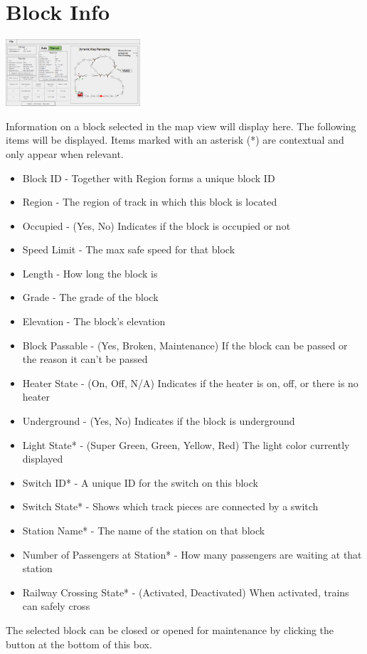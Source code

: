 \documentclass{scrreprt}
\begin{document}
\section{Block Info}
\begin{center}
  \includegraphics[trim={8.75cm 6.7cm 19.2cm 3.2cm},clip,width=5cm]{CTC-main}
\end{center}
Information on a block selected in the map view will display here. The following items
will be displayed. Items marked with an asterisk (*) are contextual and only appear when
relevant.
\begin{itemize}
  \item Block ID - Together with Region forms a unique block ID
  \item Region - The region of track in which this block is located
  \item Occupied - (Yes, No) Indicates if the block is occupied or not
  \item Speed Limit - The max safe speed for that block
  \item Length - How long the block is
  \item Grade - The grade of the block
  \item Elevation - The block's elevation
  \item Block Passable - (Yes, Broken, Maintenance) If the block can be passed or the reason
  it can't be passed
  \item Heater State - (On, Off, N/A) Indicates if the heater is on, off, or there is no heater
  \item Underground - (Yes, No) Indicates if the block is underground
  \item Light State* - (Super Green, Green, Yellow, Red) The light color currently displayed
  \item Switch ID* - A unique ID for the switch on this block
  \item Switch State* - Shows which track pieces are connected by a switch
  \item Station Name* - The name of the station on that block
  \item Number of Passengers at Station* - How many passengers are waiting at that station
  \item Railway Crossing State* - (Activated, Deactivated) When activated, trains can safely cross
\end{itemize}
The selected block can be closed or opened for maintenance by clicking the button at the
bottom of this box.
\end{document}
